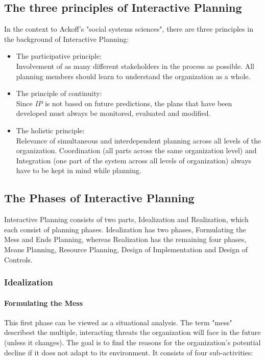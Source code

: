 \documentclass[a4paper,12pt]{scrartcl}
\begin{document}
\subsection{The three principles of Interactive Planning}
In the context to Ackoff's "social systems sciences", there are three principles in the background of Interactive Planning:
\begin{itemize}
\item The participative principle: \\Involvement of as many different stakeholders in the process as possible. All planning members should learn to understand the organization as a whole.

\item The principle of continuity:\\Since \textit{IP} is not based on future predictions, the plans that have been developed must always be monitored, evaluated and modified.

\item The holistic principle:\\Relevance of simultaneous and interdependent planning across all levels of the organization. Coordination (all parts across the same organization level) and Integration (one part of the system across all levels of organization) always have to be kept in mind while planning.
\end{itemize}


\subsection{The Phases of Interactive Planning}

Interactive Planning consists of two parts, Idealization and Realization, which each consist of planning phases. Idealization has two phases, Formulating the Mess and Ends Planning, whereas Realization has the remaining four phases, Means Planning, Resource Planning, Design of Implementation and Design of Controls.

\subsubsection{Idealization}
\paragraph{Formulating the Mess} 

This first phase can be viewed as a situational analysis. The term "mess" describest the multiple, interacting threats the organization will face in the future (unless it changes). The goal is to find the reasons for the organization's potential decline if it does not adapt to its environment. It consists of four sub-activities: 
\end{document}
